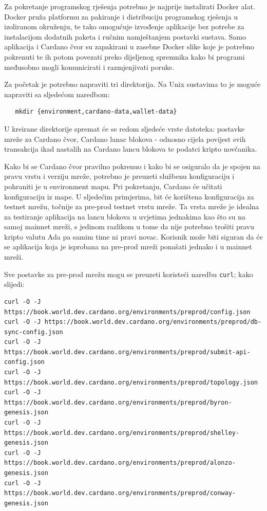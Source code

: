 \documentclass[times, utf8, diplomski]{fer}
\begin{document}
Za pokretanje programskog rješenja potrebno je najprije instalirati Docker alat. Docker pruža platformu za pakiranje i distribuciju programskog rješenja u izoliranom okruženju, te tako omogućuje izvođenje aplikacije bez potrebe za instalacijom dodatnih paketa i ručnim namještanjem postavki sustava. Samo aplikacija i Cardano čvor su zapakirani u zasebne Docker slike koje je potrebno pokrenuti te ih potom povezati preko dijeljenog spremnika kako bi programi međusobno mogli komunicirati i razmjenjivati poruke.

Za početak je potrebno napraviti tri direktorija. Na Unix sustavima to je moguće napraviti sa sljedećom naredbom:

\begin{verbatim}
   mkdir {environment,cardano-data,wallet-data}
\end{verbatim}

U kreirane direktorije spremat će se redom sljedeće vrste datoteka: postavke mreže za Cardano čvor, Cardano lanac blokova - odnosno cijela povijest svih transakcija ikad nastalih na Cardano lancu blokova te podatci kripto novčanika.

Kako bi se Cardano čvor pravilno pokrenuo i kako bi se osiguralo da je spojen na pravu vrstu i verziju mreže, potrebno je preuzeti službenu konfiguraciju i pohraniti je u environment mapu. Pri pokretanju, Cardano će učitati konfiguraciju iz mape. U sljedećim primjerima, bit će korištena konfiguracija za testnet mrežu, točnije za pre-prod testnet vrstu mreže. Ta vrsta mreže je idealna za testiranje aplikacija na lancu blokova u uvjetima jednakima kao što su na samoj mainnet mreži, s jedinom razlikom u tome da nije potrebno trošiti pravu kripto valutu Ada pa samim time ni pravi novac. Korisnik može biti siguran da će se aplikacija koja je isprobana na pre-prod mreži ponašati jednako i u mainnet mreži.

Sve postavke za pre-prod mrežu mogu se preuzeti koristeći naredbu \texttt{curl}; kako slijedi:

\begin{lstlisting}
curl -O -J https://book.world.dev.cardano.org/environments/preprod/config.json
curl -O -J https://book.world.dev.cardano.org/environments/preprod/db-sync-config.json
curl -O -J https://book.world.dev.cardano.org/environments/preprod/submit-api-config.json
curl -O -J https://book.world.dev.cardano.org/environments/preprod/topology.json
curl -O -J https://book.world.dev.cardano.org/environments/preprod/byron-genesis.json
curl -O -J https://book.world.dev.cardano.org/environments/preprod/shelley-genesis.json
curl -O -J https://book.world.dev.cardano.org/environments/preprod/alonzo-genesis.json
curl -O -J https://book.world.dev.cardano.org/environments/preprod/conway-genesis.json
\end{lstlisting}
\end{document}
